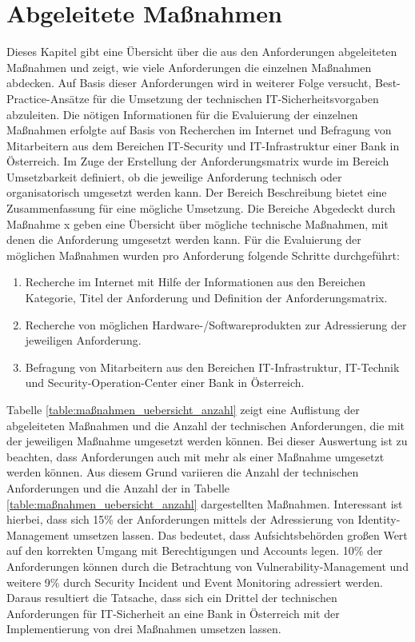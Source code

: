 \section{Abgeleitete Maßnahmen}
\label{kap_anforderungsmatrix_abgleitete_maßnahmen}
Dieses Kapitel gibt eine Übersicht über die aus den Anforderungen abgeleiteten Maßnahmen und zeigt, wie viele Anforderungen die einzelnen Maßnahmen abdecken. Auf Basis dieser Anforderungen wird in weiterer Folge versucht, Best-Practice-Ansätze für die Umsetzung der technischen IT-Sicherheitsvorgaben abzuleiten. Die nötigen Informationen für die Evaluierung der einzelnen Maßnahmen erfolgte auf Basis von Recherchen im Internet und Befragung von Mitarbeitern aus dem Bereichen \glqq{}IT-Security\grqq{} und \glqq{}IT-Infrastruktur\grqq{} einer Bank in Österreich.
\bigbreak
Im Zuge der Erstellung der Anforderungsmatrix wurde im Bereich \glqq{}Umsetzbarkeit\grqq{} definiert, ob die jeweilige Anforderung technisch oder organisatorisch umgesetzt werden kann. Der Bereich \glqq{}Beschreibung\grqq{} bietet eine Zusammenfassung für eine mögliche Umsetzung. Die Bereiche \glqq{}Abgedeckt durch Maßnahme x\grqq{} geben eine Übersicht über mögliche technische Maßnahmen, mit denen die Anforderung umgesetzt werden kann. Für die Evaluierung der möglichen Maßnahmen wurden pro Anforderung folgende Schritte durchgeführt:
\begin{enumerate}
    \item Recherche im Internet mit Hilfe der Informationen aus den Bereichen \glqq{}Kategorie\grqq{}, \glqq{}Titel der Anforderung\grqq{} und \glqq{}Definition\grqq{} der Anforderungsmatrix.
    \item Recherche von möglichen Hardware-/Softwareprodukten zur Adressierung der jeweiligen Anforderung.
    \item Befragung von Mitarbeitern aus den Bereichen \glqq{}IT-Infrastruktur\grqq{}, \glqq{}IT-Technik\grqq{} und \glqq{}Security-Operation-Center\grqq{} einer Bank in Österreich.
\end{enumerate}
\bigbreak
Tabelle \ref{table:maßnahmen_uebersicht_anzahl} zeigt eine Auflistung der abgeleiteten Maßnahmen und die Anzahl der technischen Anforderungen, die mit der jeweiligen Maßnahme umgesetzt werden können. Bei dieser Auswertung ist zu beachten, dass Anforderungen auch mit mehr als einer Maßnahme umgesetzt werden können. Aus diesem Grund variieren die Anzahl der technischen Anforderungen und die Anzahl der in Tabelle \ref{table:maßnahmen_uebersicht_anzahl} dargestellten Maßnahmen.
Interessant ist hierbei, dass sich 15\% der Anforderungen mittels der Adressierung von \glqq{}Identity-Management\grqq{} umsetzen lassen. Das bedeutet, dass Aufsichtsbehörden großen Wert auf den korrekten Umgang mit Berechtigungen und Accounts legen. 10\% der Anforderungen können durch die Betrachtung von \glqq{}Vulnerability-Management\grqq{} und weitere 9\% durch \glqq{}Security Incident und Event Monitoring\grqq{} adressiert werden. Daraus resultiert die Tatsache, dass sich ein Drittel der technischen Anforderungen für IT-Sicherheit an eine Bank in Österreich mit der Implementierung von drei Maßnahmen umsetzen lassen. 


